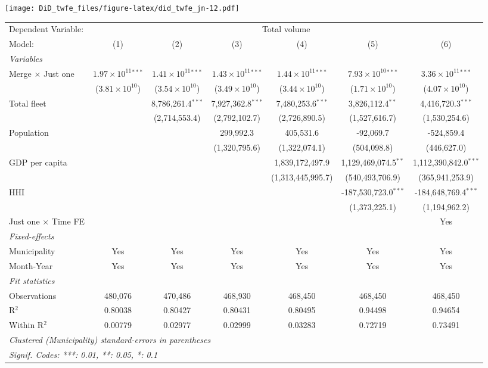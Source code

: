 \documentclass[
]{article}
\begin{document}
\texttt{[image: DiD\_twfe\_files/figure-latex/did\_twfe\_jn-12.pdf]}

\begin{tabular}{lcccccc}
\tabularnewline\midrule\midrule
Dependent Variable:&\multicolumn{6}{c}{Total volume}\\
Model:&(1) & (2) & (3) & (4) & (5) & (6)\\
\midrule \emph{Variables}&   &   &   &   &   &  \\
Merge $\times $ Just one & $1.97\times 10^{11}$$^{***}$ & $1.41\times 10^{11}$$^{***}$ & $1.43\times 10^{11}$$^{***}$ & $1.44\times 10^{11}$$^{***}$ & $7.93\times 10^{10}$$^{***}$ & $3.36\times 10^{11}$$^{***}$\\
  &($3.81\times 10^{10}$) & ($3.54\times 10^{10}$) & ($3.49\times 10^{10}$) & ($3.44\times 10^{10}$) & ($1.71\times 10^{10}$) & ($4.07\times 10^{10}$)\\
Total fleet &    & 8,786,261.4$^{***}$ & 7,927,362.8$^{***}$ & 7,480,253.6$^{***}$ & 3,826,112.4$^{**}$ & 4,416,720.3$^{***}$\\
  &   & (2,714,553.4) & (2,792,102.7) & (2,726,890.5) & (1,527,616.7) & (1,530,254.6)\\
Population &    &    & 299,992.3 & 405,531.6 & -92,069.7 & -524,859.4\\
  &   &    & (1,320,795.6) & (1,322,074.1) & (504,098.8) & (446,627.0)\\
GDP per capita &    &    &    & 1,839,172,497.9 & 1,129,469,074.5$^{**}$ & 1,112,390,842.0$^{***}$\\
  &   &    &    & (1,313,445,995.7) & (540,493,706.9) & (365,941,253.9)\\
HHI &    &    &    &    & -187,530,723.0$^{***}$ & -184,648,769.4$^{***}$\\
  &   &    &    &    & (1,373,225.1) & (1,194,962.2)\\
Just one $\times$ Time FE &  &  &  &  &  & Yes\\
\midrule \emph{Fixed-effects}&   &   &   &   &   &  \\
Municipality & Yes & Yes & Yes & Yes & Yes & Yes\\
Month-Year & Yes & Yes & Yes & Yes & Yes & Yes\\
\midrule \emph{Fit statistics}&  & & & & & \\
Observations & 480,076&470,486&468,930&468,450&468,450&468,450\\
R$^2$ & 0.80038&0.80427&0.80431&0.80495&0.94498&0.94654\\
Within R$^2$ & 0.00779&0.02977&0.02999&0.03283&0.72719&0.73491\\
\midrule\midrule\multicolumn{7}{l}{\emph{Clustered (Municipality) standard-errors in parentheses}}\\
\multicolumn{7}{l}{\emph{Signif. Codes: ***: 0.01, **: 0.05, *: 0.1}}\\
\end{tabular}
\end{document}
